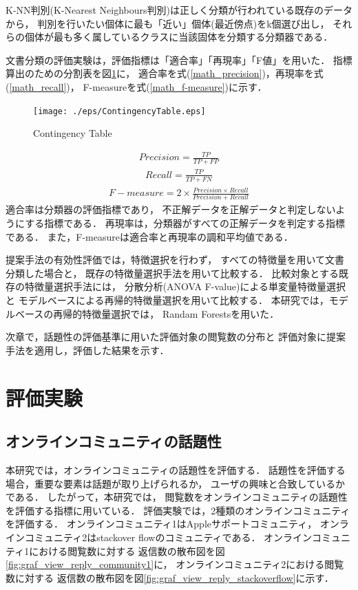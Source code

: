 \documentclass[12pt,a4paper,twocolumn,twoside]{jsik}
\begin{document}
K-NN判別(K-Nearest Neighbours判別)は正しく分類が行われている既存のデータから，
判別を行いたい個体に最も「近い」個体(最近傍点)をk個選び出し，
それらの個体が最も多く属しているクラスに当該固体を分類する分類器である\cite{k-nearest_neighbours}．

文書分類の評価実験は，評価指標は「適合率」「再現率」「F値」を用いた．
%
指標算出のための分割表を図\ref{fig:ContingencyTable}に，
適合率を式(\ref{math_precision})，再現率を式(\ref{math_recall})，
F-measureを式(\ref{math_f-measure})に示す．
%
\begin{figure}[htb]
  \begin{center}
    \texttt{[image: ./eps/ContingencyTable.eps]}
    \caption{Contingency Table}
    \label{fig:ContingencyTable}
  \end{center}
\end{figure}
%
\begin{eqnarray}
\label{math_precision}
Precision = \frac{TP}{TP+FP} 
\end{eqnarray}
%
\begin{eqnarray}
\label{math_recall}
Recall =  \frac{TP}{TP+FN} 
\end{eqnarray}
%
\begin{eqnarray}
\label{math_f-measure}
F-measure = 2  \times  \frac{Precision \times Recall}{Precision + Recall} 
\end{eqnarray}
%
適合率は分類器の評価指標であり，
不正解データを正解データと判定しないようにする指標である．
再現率は，分類器がすべての正解データを判定する指標である．
また，F-measureは適合率と再現率の調和平均値である．

提案手法の有効性評価では，特徴選択を行わず，
すべての特徴量を用いて文書分類した場合と，
既存の特徴量選択手法を用いて比較する．
%
比較対象とする既存の特徴量選択手法には，
分散分析(ANOVA F-value)による単変量特徴量選択と
モデルベースによる再帰的特徴量選択を用いて比較する．
%
本研究では，モデルベースの再帰的特徴量選択では，
Randam Forestsを用いた．

次章で，話題性の評価基準に用いた評価対象の閲覧数の分布と
評価対象に提案手法を適用し，評価した結果を示す．

\section{評価実験}
\subsection{オンラインコミュニティの話題性}
%
%
本研究では，オンラインコミュニティの話題性を評価する．
%
話題性を評価する場合，重要な要素は話題が取り上げられるか，
ユーザの興味と合致しているかである．
%
したがって，本研究では，
閲覧数をオンラインコミュニティの話題性を評価する指標に用いている．
評価実験では，2種類のオンラインコミュニティを評価する．
オンラインコミュニティ1はAppleサポートコミュニティ，
オンラインコミュニティ2はstackover flowのコミュニティである．
%
オンラインコミュニティ1における閲覧数に対する
返信数の散布図を図\ref{fig:graf_view_reply_community1}に，
オンラインコミュニティ2における閲覧数に対する
返信数の散布図を図\ref{fig:graf_view_reply_stackoverflow}に示す．
\end{document}
